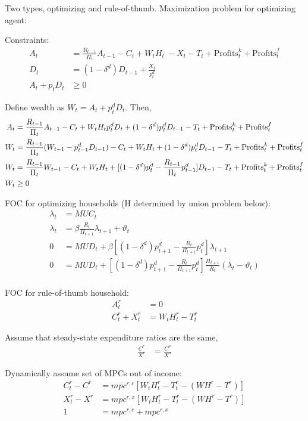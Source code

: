 \documentclass[11pt]{article}
\begin{document}
Two types, optimizing and rule-of-thumb. Maximization problem for optimizing agent:


Constraints:
\begin{align*}
	A_t &= \frac{R_{t-1}}{\Pi_t}A_{t-1} - C_t + W_t H_t\ -  X_t - T_t + \text{Profits}_t^k + \text{Profits}_t^f \\
	D_t &=  (1-\delta^d)D_{t-1} + \frac{X_t}{p_t^d} \\
	A_t + p_t D_t &\ge 0
\end{align*}

Define wealth as $W_t=A_t+p_t^d D_t$. Then,
\begin{align*}
	A_t &= \frac{R_{t-1}}{\Pi_t}A_{t-1} - C_t + W_t H_t\-  p_t^d D_t +  (1-\delta^d)p_t^d D_{t-1} - T_t + \text{Profits}_t^k + \text{Profits}_t^f \\
	W_t &= \frac{R_{t-1}}{\Pi_t}(W_{t-1} - p_{t-1}^d D_{t-1}) - C_t + W_t H_t+  (1-\delta^d)p_t^d D_{t-1} - T_t + \text{Profits}_t^k + \text{Profits}_t^f \\
	W_t &= \frac{R_{t-1}}{\Pi_t}W_{t-1}  - C_t + W_t H_t  +  [(1-\delta^d)p_t^d - \frac{R_{t-1}}{\Pi_t} p_{t-1}^d]  D_{t-1} - T_t + \text{Profits}_t^k + \text{Profits}_t^f \\
	W_t &\ge 0
\end{align*}

FOC for optimizing households (H determined by union problem below):
\begin{align*}
	\lambda_t &= MUC_t \\
	\lambda_t &= \beta \frac{R_t}{\Pi_{t+1}} \lambda_{t+1} + \vartheta_t \\
	0 &=  MUD_t + \beta [(1-\delta^d)p_{t+1}^d - \frac{R_{t}}{\Pi_{t+1}} p_{t}^d]\lambda_{t+1}\\
	0 &=  MUD_t +  [(1-\delta^d)p_{t+1}^d - \frac{R_{t}}{\Pi_{t+1}} p_{t}^d] \frac{\Pi_{t+1}}{R_t} (\lambda_t-\vartheta_t)\\
\end{align*}


FOC for rule-of-thumb household:
\begin{align*}
	A_t^r&=0 \\
	C_t^r + X_t^r &= W_t H_t^r - T_t^r
\end{align*}

Assume that steady-state expenditure ratios are the same,
\begin{align*}
	\frac{C^r}{X^r} &= \frac{C^o}{X^o}
\end{align*}

Dynamically assume set of MPCs out of income:
\begin{align*}
	C_t^r - C^r &= mpc^{r,c} [ W_t H_t^r - T_t^r - (W H^r - T^r )] \\
	X_t^r - X^r &= mpc^{r,x} [ W_t H_t^r - T_t^r - (W H^r - T^r )] \\
	1&= mpc^{r,c} + mpc^{r,x}
\end{align*}
\end{document}
